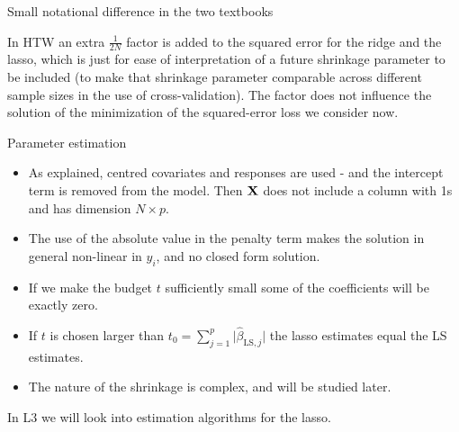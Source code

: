 \documentclass[
  ignorenonframetext,
]{beamer}
\begin{document}
\begin{frame}

\begin{block}{Small notational difference in the two textbooks}

In HTW an extra \(\frac{1}{2N}\) factor is added to the squared error
for the ridge and the lasso, which is just for ease of interpretation of
a future shrinkage parameter to be included (to make that shrinkage
parameter comparable across different sample sizes in the use of
cross-validation). The factor does not influence the solution of the
minimization of the squared-error loss we consider now.

\end{block}

\end{frame}

\begin{frame}

\begin{block}{Parameter estimation}

\begin{itemize}
\item
  As explained, centred covariates and responses are used - and the
  intercept term is removed from the model. Then \({\bf X}\) does not
  include a column with 1s and has dimension \(N \times p\).
\item
  The use of the absolute value in the penalty term makes the solution
  in general non-linear in \(y_i\), and no closed form solution.
\item
  If we make the budget \(t\) sufficiently small some of the
  coefficients will be exactly zero.
\item
  If \(t\) is chosen larger than
  \(t_0=\sum_{j=1}^p \lvert \hat{\beta}_{{\text {LS}},j} \rvert\) the
  lasso estimates equal the LS estimates.
\item
  The nature of the shrinkage is complex, and will be studied later.
\end{itemize}

In L3 we will look into estimation algorithms for the lasso.

\end{block}

\end{frame}
\end{document}
